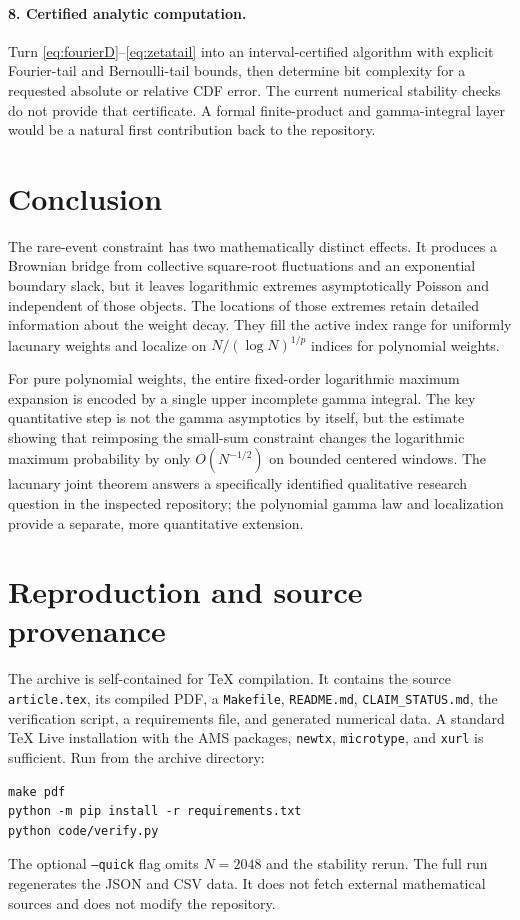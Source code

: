 \documentclass[11pt,a4paper]{article}
\numberwithin{equation}{section}
\theoremstyle{definition}
\theoremstyle{remark}
\begin{document}
\paragraph{8. Certified analytic computation.}
Turn \eqref{eq:fourierD}--\eqref{eq:zetatail} into an interval-certified
algorithm with explicit Fourier-tail and Bernoulli-tail bounds,
then determine bit complexity for a requested absolute or relative
CDF error. The current numerical stability checks do not provide
that certificate. A formal finite-product and gamma-integral layer
would be a natural first contribution back to the repository.

\section{Conclusion}
The rare-event constraint has two mathematically distinct effects.
It produces a Brownian bridge from collective square-root fluctuations
and an exponential boundary slack, but it leaves logarithmic extremes
asymptotically Poisson and independent of those objects. The locations
of those extremes retain detailed information about the weight decay.
They fill the active index range for uniformly lacunary weights and
localize on $N/(\log N)^{1/p}$ indices for polynomial weights.

For pure polynomial weights, the entire fixed-order logarithmic
maximum expansion is encoded by a single upper incomplete gamma
integral. The key quantitative step is not the gamma asymptotics by
itself, but the estimate showing that reimposing the small-sum
constraint changes the logarithmic maximum probability by only
$O(N^{-1/2})$ on bounded centered windows. The lacunary joint theorem
answers a specifically identified qualitative research question in
the inspected repository; the polynomial gamma law and localization
provide a separate, more quantitative extension.

\appendix
\section{Reproduction and source provenance}
\label{app:reproduce}
The archive is self-contained for TeX compilation. It contains the
source \texttt{article.tex}, its compiled PDF, a \texttt{Makefile},
\texttt{README.md}, \texttt{CLAIM\_STATUS.md}, the verification script,
a requirements file, and generated numerical data. A standard TeX Live
installation with the AMS packages, \texttt{newtx}, \texttt{microtype},
and \texttt{xurl} is sufficient. Run from the archive directory:
\begin{verbatim}
make pdf
python -m pip install -r requirements.txt
python code/verify.py
\end{verbatim}
The optional \texttt{--quick} flag omits $N=2048$ and the stability
rerun. The full run regenerates the JSON and CSV data. It does not
fetch external mathematical sources and does not modify the repository.
\end{document}
